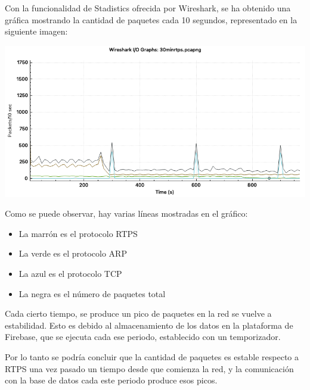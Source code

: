 Con la funcionalidad de Stadistics ofrecida por Wireshark, se ha obtenido una gráfica mostrando la cantidad de paquetes cada 10 segundos, representado en la siguiente imagen:

\begin{center}
    \centering
    \includegraphics[width=\textwidth]{img/09-30minrtps.png}
    \label{fig:wireshark-30min}
\end{center}

Como se puede observar, hay varias líneas mostradas en el gráfico:

\begin{itemize}
    \item La marrón es el protocolo RTPS
    \item La verde es el protocolo ARP
    \item La azul es el protocolo TCP
    \item La negra es el número de paquetes total
\end{itemize}

Cada cierto tiempo, se produce un pico de paquetes en la red se vuelve a estabilidad. Esto es debido al almacenamiento de los datos en la plataforma de Firebase, que se ejecuta cada ese periodo, establecido con un temporizador.

Por lo tanto se podría concluir que la cantidad de paquetes es estable respecto a RTPS una vez pasado un tiempo desde que comienza la red, y la comunicación con la base de datos cada este periodo produce esos picos.